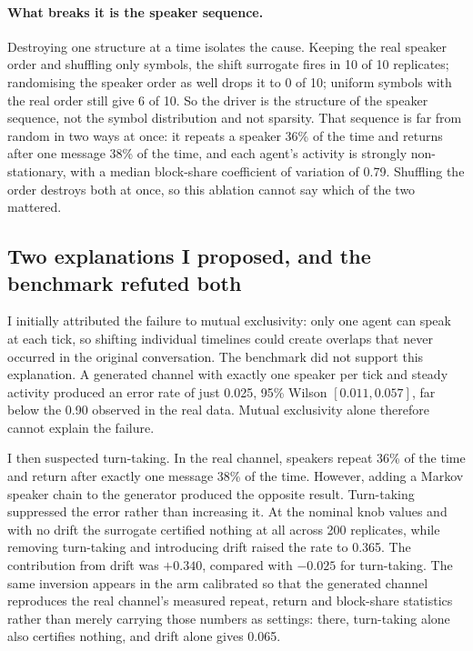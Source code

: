 \documentclass[10pt]{article}
\begin{document}
\paragraph{What breaks it is the speaker sequence.} Destroying one structure at a time isolates the
cause. Keeping the real speaker order and shuffling only symbols, the shift surrogate fires in 10 of
10 replicates; randomising the speaker order as well drops it to 0 of 10; uniform symbols with the
real order still give 6 of 10. So the driver is the structure of the speaker sequence, not the
symbol distribution and not sparsity. That sequence is far from random in two ways at once: it
repeats a speaker 36\% of the time and returns after one message 38\% of the time, and each agent's
activity is strongly non-stationary, with a median block-share coefficient of variation of 0.79.
Shuffling the order destroys both at once, so this ablation cannot say which of the two mattered.

\subsection{Two explanations I proposed, and the benchmark refuted both}

I initially attributed the failure to mutual exclusivity: only one agent can speak at each tick, so
shifting individual timelines could create overlaps that never occurred in the original
conversation. The benchmark did not support this explanation. A generated channel with exactly one
speaker per tick and steady activity produced an error rate of just 0.025, 95\% Wilson
$[0.011, 0.057]$, far below the 0.90 observed in the real data. Mutual exclusivity alone therefore
cannot explain the failure.

I then suspected turn-taking. In the real channel, speakers repeat 36\% of the time and return after
exactly one message 38\% of the time. However, adding a Markov speaker chain to the generator
produced the opposite result. Turn-taking suppressed the error rather than increasing it. At the
nominal knob values and with no drift the surrogate certified nothing at all across 200 replicates,
while removing turn-taking and introducing drift raised the rate to 0.365. The contribution from
drift was $+0.340$, compared with $-0.025$ for turn-taking. The same inversion appears in the arm
calibrated so that the generated channel reproduces the real channel's measured repeat, return and
block-share statistics rather than merely carrying those numbers as settings: there, turn-taking
alone also certifies nothing, and drift alone gives 0.065.
\end{document}
